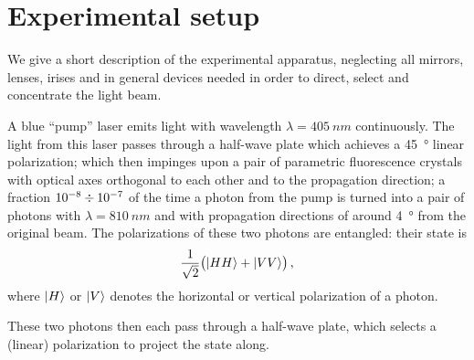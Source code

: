 \documentclass[main.tex]{subfiles}
\begin{document}
\section{Experimental setup}


We give a short description of the experimental apparatus, neglecting all mirrors, lenses, irises and in general devices needed in order to direct, select and concentrate the light beam.

A blue ``pump'' laser emits light with wavelength \(\lambda = \SI{405}{nm}\) continuously.
The light from this laser passes through a half-wave plate which achieves a \SI{45}{\degree} linear polarization;
which then impinges upon a pair of parametric fluorescence crystals with optical axes orthogonal to each other and to the propagation direction;
a fraction \(\num{e-8}\divisionsymbol \num{e-7} \) of the time a photon from the pump is turned into a pair of photons with \(\lambda = \SI{810}{nm}\) and with propagation directions of around \SI{4}{\degree} from the original beam. 
The polarizations of these two photons are entangled: their state is 
%
\begin{align} \label{eq:epr-state}
\frac{1}{\sqrt{2}} \qty(\ket{HH} + \ket{VV})
\,,
\end{align}
%
where \(\ket{H}\) or \(\ket{V}\) denotes the horizontal or vertical polarization of a photon. 

These two photons then each pass through a half-wave plate, which selects a (linear) polarization to project the state along.
\end{document}
